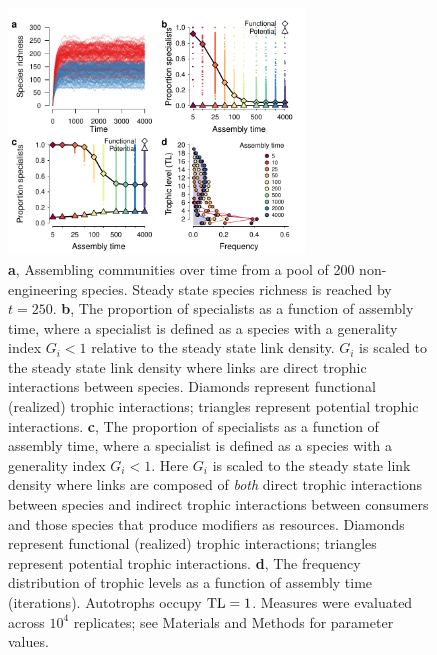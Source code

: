 \documentclass[twocolumn,preprintnumbers,amsmath,amssymb,superscriptaddress,linenumbers]{revtex4-1}
\begin{document}
\begin{figure}[h!]
\centering
\includegraphics[width=0.7\textwidth]{fig_trophic3_eng.pdf}
\caption{
\textbf{a}, Assembling communities over time from a pool of 200 non-engineering species. 
Steady state species richness is reached by $t=250$.
\textbf{b}, The proportion of specialists as a function of assembly time, where a specialist is defined as a species with a generality index $G_i < 1$ relative to the steady state link density.
$G_i$ is scaled to the steady state link density where links are direct trophic interactions between species.
Diamonds represent functional (realized) trophic interactions; triangles represent potential trophic interactions.
\textbf{c}, The proportion of specialists as a function of assembly time, where a specialist is defined as a species with a generality index $G_i < 1$.
Here $G_i$ is scaled to the steady state link density where links are composed of \emph{both} direct trophic interactions between species and indirect trophic interactions between consumers and those species that produce modifiers as resources.
Diamonds represent functional (realized) trophic interactions; triangles represent potential trophic interactions.
\textbf{d}, The frequency distribution of trophic levels as a function of assembly time (iterations). 
Autotrophs occupy ${\rm TL}=1$.
Measures were evaluated across $10^4$ replicates; see Materials and Methods for parameter values.
}
\label{fig:trophiceng}
\end{figure}
\end{document}
